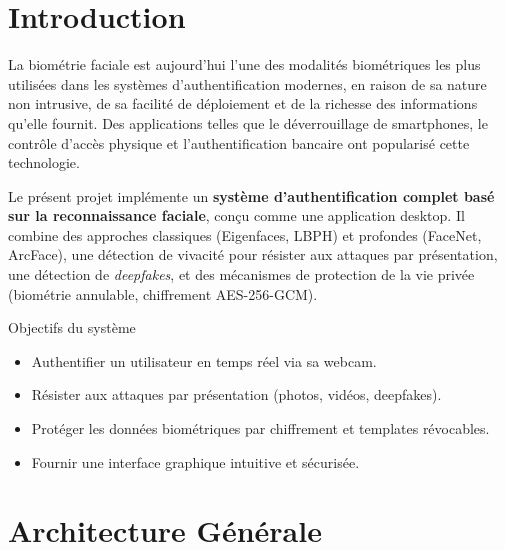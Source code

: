 \documentclass[12pt,a4paper]{article}
\begin{document}
\tableofcontents
\newpage

\section{Introduction}

La biométrie faciale est aujourd'hui l'une des modalités biométriques les plus
utilisées dans les systèmes d'authentification modernes, en raison de sa nature
non intrusive, de sa facilité de déploiement et de la richesse des informations
qu'elle fournit. Des applications telles que le déverrouillage de smartphones,
le contrôle d'accès physique et l'authentification bancaire ont popularisé cette
technologie.

Le présent projet implémente un \textbf{système d'authentification complet basé
sur la reconnaissance faciale}, conçu comme une application desktop. Il combine
des approches classiques (Eigenfaces, LBPH) et profondes (FaceNet, ArcFace),
une détection de vivacité pour résister aux attaques par présentation, une
détection de \textit{deepfakes}, et des mécanismes de protection de la vie
privée (biométrie annulable, chiffrement AES-256-GCM).

\begin{infobox}{Objectifs du système}
  \begin{itemize}
    \item Authentifier un utilisateur en temps réel via sa webcam.
    \item Résister aux attaques par présentation (photos, vidéos, deepfakes).
    \item Protéger les données biométriques par chiffrement et templates
          révocables.
    \item Fournir une interface graphique intuitive et sécurisée.
  \end{itemize}
\end{infobox}

\section{Architecture Générale}
\end{document}
